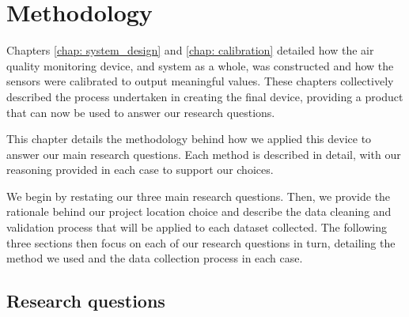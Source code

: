\documentclass[11pt]{report}
\begin{document}
%
%
%





\chapter{Methodology} \label{chap: methodology}

Chapters \ref{chap: system_design} and \ref{chap: calibration} detailed how the air quality monitoring device, and system as a whole, was constructed and how the sensors were calibrated to output meaningful values. These chapters collectively described the process undertaken in creating the final device, providing a product that can now be used to answer our research questions.

This chapter details the methodology behind how we applied this device to answer our main research questions. Each method is described in detail, with our reasoning provided in each case to support our choices.

We begin by restating our three main research questions. Then, we provide the rationale behind our project location choice and describe the data cleaning and validation process that will be applied to each dataset collected. The following three sections then focus on each of our research questions in turn, detailing the method we used and the data collection process in each case.

\section{Research questions}
\end{document}
